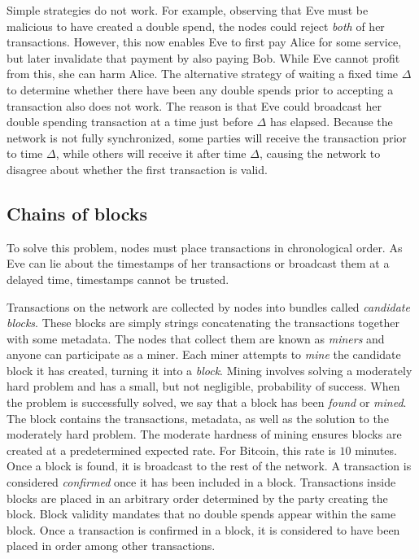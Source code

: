 Simple strategies do not work. For example, observing that Eve must be malicious
to have created a double spend, the nodes could reject \emph{both} of her
transactions. However, this now enables Eve to first pay Alice for some service,
but later invalidate that payment by also paying Bob. While Eve cannot profit
from this, she can harm Alice. The alternative strategy of waiting a fixed time
$\Delta$ to determine whether there have been any double spends prior to
accepting a transaction also does not work. The reason is that Eve could
broadcast her double spending transaction at a time just before $\Delta$ has
elapsed. Because the network is not fully synchronized, some parties will
receive the transaction prior to time $\Delta$, while others will receive it
after time $\Delta$, causing the network to disagree about whether the first
transaction is valid.

\subsection{Chains of blocks}
To solve this problem, nodes must place transactions in chronological order. As
Eve can lie about the timestamps of her transactions or broadcast them at a
delayed time, timestamps cannot be trusted.

Transactions on the network are collected by nodes into bundles called
\emph{candidate blocks}. These blocks are simply strings concatenating the
transactions together with some metadata. The nodes that collect them are known
as \emph{miners} and anyone can participate as a miner. Each miner attempts to
\emph{mine} the candidate block it has created, turning it into a \emph{block}.
Mining involves solving a moderately hard problem and has a small, but not
negligible, probability of success. When the problem is successfully solved, we
say that a block has been \emph{found} or \emph{mined}. The block contains the
transactions, metadata, as well as the solution to the moderately hard problem.
The moderate hardness of mining ensures blocks are created at a predetermined
expected rate. For Bitcoin, this rate is $10$ minutes. Once a block is found, it
is broadcast to the rest of the network. A transaction is considered
\emph{confirmed} once it has been included in a block. Transactions inside
blocks are placed in an arbitrary order determined by the party creating the
block. Block validity mandates that no double spends appear within the same
block. Once a transaction is confirmed in a block, it is considered to have been
placed in order among other transactions.

